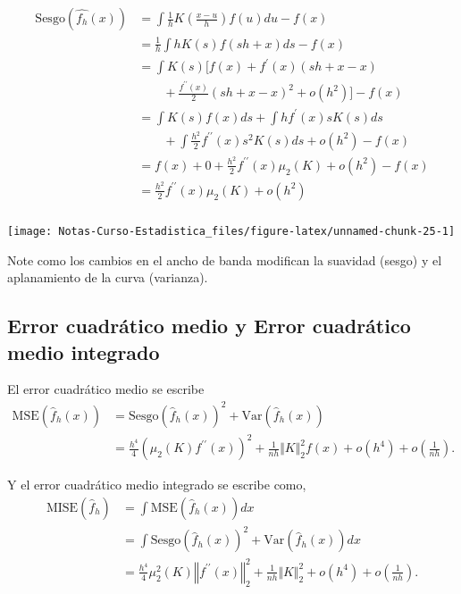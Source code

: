 \documentclass[
  12pt,
]{book}
\theoremstyle{definition}
\theoremstyle{definition}
\theoremstyle{definition}
\theoremstyle{remark}
\let\BeginKnitrBlock\begin \let\EndKnitrBlock\end
\begin{document}
\BeginKnitrBlock{solution}
{}\begin{align*}
\mathrm{Sesgo}(\hat{f_{h}}(x)) & = \int \frac{1}{h} K\left( \frac{x-u}{h} \right) f(u)du - f(x)     \\
& = \frac{1}{h} \int hK(s)f(sh+x) ds - f(x) \\
& = \int K(s)\Biggl[ f(x) + f^{\prime}(x)(sh+x-x)  \\
&  \qquad  + \frac{f^{\prime\prime}(x)}{2}(sh+x-x)^2 + o(h^{2}) \Biggr] - f(x) \\
& = \int K(s)f(x)ds + \int hf^{\prime}(x)sK(s) ds  \\
& \qquad  + \int \frac{h^2}{2} f^{\prime\prime}(x)s^2K(s) ds + o(h^2) - f(x) \\
& = f(x) + 0 + \frac{h^2}{2}f^{\prime\prime}(x)\mu_{2}(K) + o(h^2) - f(x)   \\
& = \frac{h^2}{2}f^{\prime\prime}(x)\mu_{2}(K) + o(h^2) \\
\end{align*}
\EndKnitrBlock{solution}

\begin{center}\texttt{[image: Notas-Curso-Estadistica\_files/figure-latex/unnamed-chunk-25-1]} \end{center}

\BeginKnitrBlock{remark}
{}Note como los cambios en el ancho de banda modifican la suavidad (sesgo) y el aplanamiento de la curva (varianza).
\EndKnitrBlock{remark}

\hypertarget{error-cuadruxe1tico-medio-y-error-cuadruxe1tico-medio-integrado}{%
\subsection{Error cuadrático medio y Error cuadrático medio integrado}\label{error-cuadruxe1tico-medio-y-error-cuadruxe1tico-medio-integrado}}

El error cuadrático medio se escribe
\begin{align*}
\mathrm{MSE}(\hat{f}_{h}(x))
& = \mathrm{Sesgo}\left(\hat{f}_{h}(x)\right)^{2} + \mathrm{Var}\left(\hat{f}_{h}(x)\right)                                                 \\
& = \frac{h^{4}}{4}\left(\mu_{2}(K)f^{\prime\prime}(x)\right)^{2}+\frac{1}{nh}\Vert K\Vert_{2}^{2}f(x)+o(h^{4})+o\left(\frac{1}{nh}\right).
\end{align*}

Y el error cuadrático medio integrado se escribe como,
\begin{align*}
\mathrm{MISE}\left(\hat{f}_{h}\right) & = \int \mathrm{MSE}\left(\hat{f}_{h}(x)\right)dx                                                                                                        \\
& = \int \mathrm{Sesgo}\left(\hat{f}_{h}(x)\right)^{2} + \mathrm{Var}\left(\hat{f}_{h}(x)\right)dx                                                        \\
& = \frac{h^{4}}{4}\mu_{2}^{2}(K)\left\Vert f^{\prime\prime}(x)\right\Vert_{2}^{2} +\frac{1}{nh}\Vert K\Vert_{2}^{2}+o(h^{4})+o\left(\frac{1}{nh}\right).
\end{align*}
\end{document}
